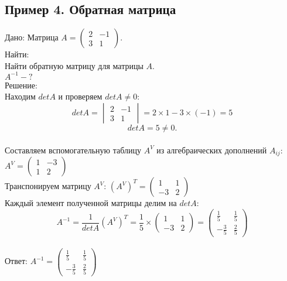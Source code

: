 \documentclass[a4paper,12pt]{article} %
\begin{document}
\begin{flushleft}
\section*{Пример 4. Обратная матрица}
Дано: Матрица
$ A=\begin{pmatrix}
2 & -1 \\
3 & 1
\end{pmatrix} $. \\
Найти:\\
Найти обратную матрицу для матрицы $A$.\\
$A^{-1}-?$\\
Решение:\\
Находим $det A$ и проверяем $det A \neq 0$:\\
$$det A=\begin{vmatrix}
2 & -1 \\
3 & 1
\end{vmatrix}=2 \times 1-3 \times (-1) = 5$$
$$det A = 5 \neq 0.$$ \\
Составляем вспомогательную таблицу $A^V$ из алгебраических дополнений $A_{ij}$: $A^V=\begin{pmatrix}
1 & -3 \\
1 & 2
\end{pmatrix}$\\
Транспонируем матрицу $A^V$: $(A^V)^T=\begin{pmatrix}
1 & 1 \\
-3 & 2
\end{pmatrix}$\\
Каждый элемент полученной матрицы делим на $det A$:\\
$$A^{-1}=\frac{1}{det A}(A^V)^T=\frac{1}{5} \times \begin{pmatrix}
1 & 1 \\
-3 & 2
\end{pmatrix} = \begin{pmatrix}
\frac{1}{5} & \frac{1}{5} \\
-\frac{3}{5} & \frac{2}{5}
\end{pmatrix}$$\\
Ответ: $A^{-1}=\begin{pmatrix}
\frac{1}{5} & \frac{1}{5} \\
-\frac{3}{5} & \frac{2}{5}
\end{pmatrix}$

\end{flushleft}
\end{document}
